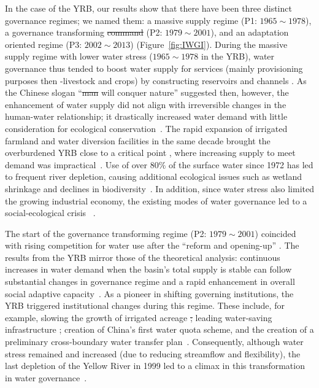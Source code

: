 \documentclass[draft]{../agujournal2019}
\providecommand{\DIFadd}[1]{{\protect\color{blue}\uwave{#1}}} %
\providecommand{\DIFdel}[1]{{\protect\color{red}\sout{#1}}}                      %
\providecommand{\DIFaddbegin}{} %
\providecommand{\DIFaddend}{} %
\providecommand{\DIFdelbegin}{} %
\providecommand{\DIFdelend}{} %
\begin{document}
In the case of the YRB, our results show that there have been three distinct governance regimes; we named them: a massive supply regime (P1: $1965 \sim 1978$), a governance transforming \DIFdelbegin \DIFdel{command }\DIFdelend \DIFaddbegin \DIFadd{regime }\DIFaddend (P2: $1979 \sim 2001$), and an adaptation oriented regime (P3: $2002 \sim 2013$) (Figure~\ref{fig:IWGI}).
During the massive supply regime with lower water stress ($1965 \sim 1978$ in the YRB), water governance thus tended to boost water supply for services (mainly provisioning purposes then -livestock and crops) by constructing reservoirs and channels \DIFaddbegin \DIFadd{(Figure~\ref{fig:Causes}~B)}\DIFaddend .
As the Chinese slogan ``\DIFdelbegin \DIFdel{man }\DIFdelend \DIFaddbegin \DIFadd{human }\DIFaddend will conquer nature'' suggested then, however, the enhancement of water supply did not align with irreversible changes in the human-water relationship; it drastically increased water demand with little consideration for ecological conservation~\cite{zhou2020}.
The rapid expansion of irrigated farmland and water diversion facilities in the same decade brought the overburdened YRB close to a critical point \DIFaddbegin \DIFadd{(Figure~\ref{fig:Causes})}\DIFaddend , where increasing supply to meet demand was impractical~\cite{loch2020}.
Use of over $80\%$ of the surface water since 1972 has led to frequent river depletion, causing additional ecological issues such as wetland shrinkage and declines in biodiversity~\cite{wang2019c}.
In addition, since water stress also limited the growing industrial economy, the existing modes of water governance led to a social-ecological crisis~\DIFdelbegin %
\DIFdelend \DIFaddbegin \cite{wohlfart2016}\DIFaddend .

The start of the governance transforming regime (P2: $1979 \sim 2001$) coincided with rising competition for water use after the ``reform and opening-up'' \DIFaddbegin \DIFadd{(Figure~\ref{fig:Causes}~C)}\DIFaddend .
The results from the YRB mirror those of the theoretical analysis: continuous increases in water demand when the basin's total supply is stable can follow substantial changes in governance regime and a rapid enhancement in overall social adaptive capacity~\cite{loch2020}.
As a pioneer in shifting governing institutions, the YRB triggered institutional changes during this regime. These include, for example, slowing the growth of irrigated acreage \DIFdelbegin \DIFdel{; }\DIFdelend \DIFaddbegin \DIFadd{and }\DIFaddend leading water-saving infrastructure \DIFaddbegin \DIFadd{(Figure~\ref{fig:Causes})}\DIFaddend ; creation of China's first water quota scheme, and the creation of a preliminary cross-boundary water transfer plan~\cite{wang2019e,long2020,nickum2021}.
Consequently, although water stress remained and increased (due to reducing streamflow and flexibility), the last depletion of the Yellow River in 1999 led to a climax in this transformation in water governance~\cite{wang2019e}.
\end{document}
